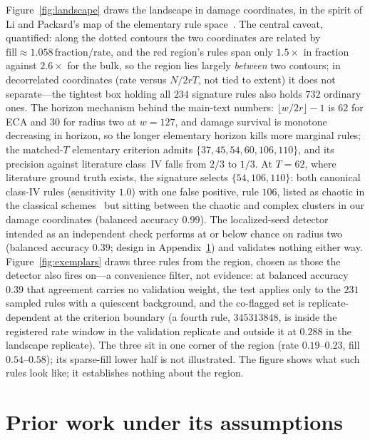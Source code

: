 \documentclass[aip,cha,amsmath,amssymb,reprint,floatfix]{revtex4-2}
\begin{document}
Figure~\ref{fig:landscape} draws the landscape in damage coordinates, in
the spirit of Li and Packard's map of the elementary rule
space~\cite{lipackard1990}. The central caveat, quantified: along the dotted
contours the two coordinates are related by
$\text{fill}\approx1.058\,\text{fraction}/\text{rate}$, and the red region's
rules span only $1.5\times$ in fraction against $2.6\times$ for the bulk, so
the region lies largely \emph{between} two contours; in decorrelated
coordinates (rate versus $N/2rT$, not tied to extent) it does not
separate---the tightest box holding all $234$ signature rules also holds
$732$ ordinary ones. The horizon mechanism behind the
main-text numbers: $\lfloor w/2r\rfloor-1$ is $62$ for ECA and $30$ for
radius two at $w=127$, and damage survival is monotone decreasing in horizon,
so the longer elementary horizon kills more marginal rules; the matched-$T$
elementary criterion admits $\{37,45,54,60,106,110\}$, and its precision
against literature class~IV falls from $2/3$ to $1/3$. At $T=62$, where literature
ground truth exists, the signature selects $\{54,106,110\}$: both canonical
class-IV rules (sensitivity $1.0$) with one false positive, rule $106$,
listed as chaotic in the classical schemes~\cite{wolfram1984,lipackard1990}
but sitting between the chaotic and complex clusters in our damage
coordinates (balanced accuracy $0.99$). The localized-seed detector intended
as an independent check performs at or below chance on radius two (balanced
accuracy $0.39$; design in Appendix~\ref{app:priorwork}) and validates
nothing either way. Figure~\ref{fig:exemplars} draws three rules from the
region, chosen as those the detector also fires on---a convenience filter,
not evidence: at balanced accuracy $0.39$ that agreement carries no
validation weight, the test applies only to the $231$ sampled rules with a
quiescent background, and the co-flagged set is replicate-dependent at the
criterion boundary (a fourth rule, $345313848$, is inside the registered
rate window in the validation replicate and outside it at $0.288$ in the
landscape replicate). The three sit in one corner of the region (rate
$0.19$--$0.23$, fill $0.54$--$0.58$); its sparse-fill lower half is not
illustrated. The figure shows what such rules look like; it establishes
nothing about the region.

\section{Prior work under its assumptions}
\label{app:priorwork}
\end{document}
